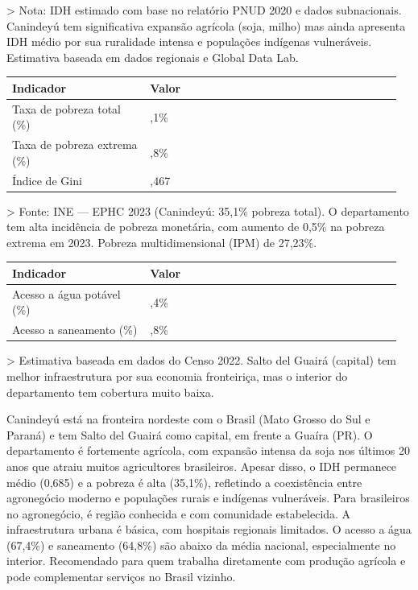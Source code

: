 > Nota: IDH estimado com base no relatório PNUD 2020 e dados subnacionais. Canindeyú tem significativa expansão agrícola (soja, milho) mas ainda apresenta IDH médio por sua ruralidade intensa e populações indígenas vulneráveis. Estimativa baseada em dados regionais e Global Data Lab.


{\small
\setlength{\tabcolsep}{3pt}
\renewcommand{\arraystretch}{1.12}
\begin{tabularx}{\linewidth}{>{\raggedright\arraybackslash}p{0.34\linewidth} >{\raggedright\arraybackslash}p{0.62\linewidth}}
\toprule
Indicador & Valor \\
\midrule
Taxa de pobreza total (\%) & 35,1\% \\
Taxa de pobreza extrema (\%) & 10,8\% \\
Índice de Gini & 0,467 \\
\bottomrule
\end{tabularx}
}

> Fonte: INE --- EPHC 2023 (Canindeyú: 35,1\% pobreza total). O departamento tem alta incidência de pobreza monetária, com aumento de 0,5\% na pobreza extrema em 2023. Pobreza multidimensional (IPM) de 27,23\%.


{\small
\setlength{\tabcolsep}{3pt}
\renewcommand{\arraystretch}{1.12}
\begin{tabularx}{\linewidth}{>{\raggedright\arraybackslash}p{0.34\linewidth} >{\raggedright\arraybackslash}p{0.62\linewidth}}
\toprule
Indicador & Valor \\
\midrule
Acesso a água potável (\%) & 67,4\% \\
Acesso a saneamento (\%) & 64,8\% \\
\bottomrule
\end{tabularx}
}

> Estimativa baseada em dados do Censo 2022. Salto del Guairá (capital) tem melhor infraestrutura por sua economia fronteiriça, mas o interior do departamento tem cobertura muito baixa.


Canindeyú está na fronteira nordeste com o Brasil (Mato Grosso do Sul e Paraná) e tem Salto del Guairá como capital, em frente a Guaíra (PR). O departamento é fortemente agrícola, com expansão intensa da soja nos últimos 20 anos que atraiu muitos agricultores brasileiros. Apesar disso, o IDH permanece médio (0,685) e a pobreza é alta (35,1\%), refletindo a coexistência entre agronegócio moderno e populações rurais e indígenas vulneráveis. Para brasileiros no agronegócio, é região conhecida e com comunidade estabelecida. A infraestrutura urbana é básica, com hospitais regionais limitados. O acesso a água (67,4\%) e saneamento (64,8\%) são abaixo da média nacional, especialmente no interior. Recomendado para quem trabalha diretamente com produção agrícola e pode complementar serviços no Brasil vizinho.



